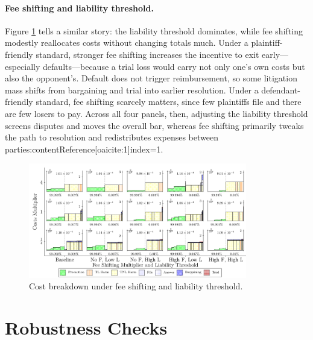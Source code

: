 \documentclass{article}
\begin{document}
\paragraph{Fee shifting and liability threshold.}
Figure \ref{fig:fee_liability} tells a similar story: the liability threshold dominates, while fee shifting modestly reallocates costs without changing totals much. Under a plaintiff-friendly standard, stronger fee shifting increases the incentive to exit early—especially defaults—because a trial loss would carry not only one’s own costs but also the opponent’s. Default does not trigger reimbursement, so some litigation mass shifts from bargaining and trial into earlier resolution. Under a defendant-friendly standard, fee shifting scarcely matters, since few plaintiffs file and there are few losers to pay. Across all four panels, then, adjusting the liability threshold screens disputes and moves the overall bar, whereas fee shifting primarily tweaks the path to resolution and redistributes expenses between parties:contentReference[oaicite:1]{index=1}.

\begin{figure}[ht]
  \centering
  \includegraphics[width=0.85\textwidth]{../Figures/Cost Breakdown Fee Shifting Multiplier and Liability Threshold (All Rows).pdf}
  \caption{Cost breakdown under fee shifting and liability threshold.}
  \label{fig:fee_liability}
\end{figure}

\section{Robustness Checks}

\FloatBarrier
\end{document}
